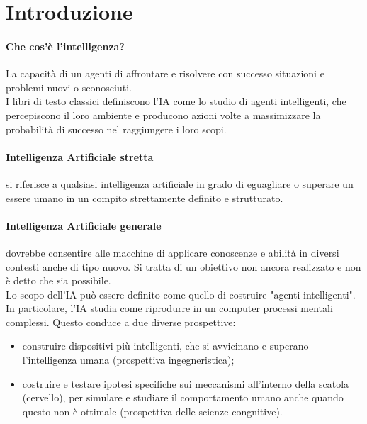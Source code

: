 \section{Introduzione}

\paragraph{Che cos'è l'intelligenza?}
La capacità di un agenti di affrontare e risolvere con successo situazioni e
problemi nuovi o sconosciuti.\\
I libri di testo classici definiscono l'IA come lo studio di agenti
intelligenti, che percepiscono il loro ambiente e producono azioni volte a
massimizzare la probabilità di successo nel raggiungere i loro scopi.

\paragraph{Intelligenza Artificiale stretta} si riferisce a qualsiasi
intelligenza artificiale in grado di eguagliare o superare un essere umano in un
compito strettamente definito e strutturato.

\paragraph{Intelligenza Artificiale generale} dovrebbe consentire alle macchine
di applicare conoscenze e abilità in diversi contesti anche di tipo nuovo. Si
tratta di un obiettivo non ancora realizzato e non è detto che sia possibile.\\

Lo scopo dell'IA può essere definito come quello di costruire "agenti
intelligenti". In particolare, l'IA studia come riprodurre in un computer 
processi mentali complessi. Questo conduce a due diverse prospettive:
\begin{itemize}
	\item construire dispositivi più intelligenti, che si avvicinano e superano
		l'intelligenza umana (prospettiva ingegneristica);

	\item costruire e testare ipotesi specifiche sui meccanismi all'interno 
		della scatola (cervello), per simulare e studiare il 
		comportamento umano anche quando questo non è ottimale (prospettiva 
		delle scienze congnitive).
\end{itemize}
